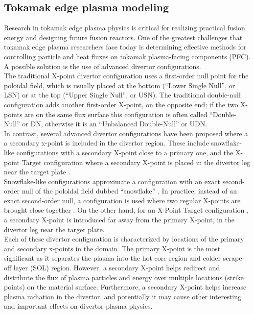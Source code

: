 \subsection{\label{sec:level2}Tokamak edge plasma modeling}
%
Research in tokamak edge plasma physics is critical for realizing
practical fusion energy and designing future fusion reactors. One of
the greatest challenges that tokamak edge plasma researchers face
today is determining effective methods for controlling particle and
heat fluxes on tokamak plasma-facing components (PFC). A possible
solution is the use of advanced divertor configurations. \\ \indent
%
The traditional X-point divertor configuration uses a first-order null
point for the poloidal field, which is usually placed at the bottom
(``Lower Single Null'', or LSN) or at the top (``Upper Single Null'',
or USN).  The traditional double-null configuration adds another
first-order X-point, on the opposite end; if the two X-points are on
the same flux surface this configuration is often called
``Double-Null'' or DN, otherwise it is an ``Unbalanced Double-Null''
or UDN. \\ \indent
%
In contrast, several advanced divertor configurations have been
proposed where a a secondary x-point is included in the divertor
region. These include snowflake-like configurations with a secondary
X-point close to a primary one, and the X-point Target configuration
where a secondary X-point is placed in the divertor leg near the
target plate \cite{}. \\ \indent
%
Snowflake-like configurations approximate a configuration with an
exact second-order null of the poloidal field dubbed ``snowflake''
\cite{Ryutov2007}. In practice, instead of an exact second-order null,
a configuration is used where two regular X-points are brought close
together \cite{Ryutov2008}. On the other hand, for an X-Point Target
configuration \cite{LaBombard2015}, a secondary X-point is introduced
far away from the primary X-point, in the divertor leg near the target
plate. \\ \indent
%
Each of these divertor configuration is characterized by locations of
the primary and secondary x-points in the domain. The primary X-point
is the most significant as it separates the plasma into the hot core
region and colder scrape-off layer (SOL) region. However, a secondary
X-point helps redirect and distribute the flux of plasma particles and
energy over multiple locations (strike points) on the material
surface.  Furthermore, a secondary X-point helps increase plasma
radiation in the divertor, and potentially it may cause other
interesting and important effects on divertor plasma physics.
